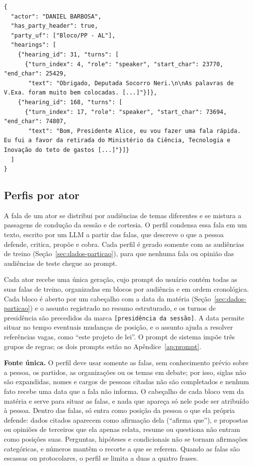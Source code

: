 \begin{lstlisting}[float=tbp,caption={Exemplo de registro de falas por ator, restrito às audiências
de treino. Os textos foram truncados em {[\ldots]}, e o campo com a concatenação dos turnos de cada
audiência foi omitido.},label=lst:ator]
{
  "actor": "DANIEL BARBOSA",
  "has_party_header": true,
  "party_uf": ["Bloco/PP - AL"],
  "hearings": [
    {"hearing_id": 31, "turns": [
      {"turn_index": 4, "role": "speaker", "start_char": 23770, "end_char": 25429,
       "text": "Obrigado, Deputada Socorro Neri.\n\nAs palavras de V.Exa. foram muito bem colocadas. [...]"}]},
    {"hearing_id": 168, "turns": [
      {"turn_index": 17, "role": "speaker", "start_char": 73694, "end_char": 74807,
       "text": "Bom, Presidente Alice, eu vou fazer uma fala rápida. Eu fui a favor da retirada do Ministério da Ciência, Tecnologia e Inovação do teto de gastos [...]"}]}
  ]
}
\end{lstlisting}

\subsection{Perfis por ator}
\label{sec:metodo-perfis}

A fala de um ator se distribui por audiências de temas diferentes e se mistura a passagens de
condução da sessão e de cortesia. O perfil condensa essa fala em um texto, escrito por um LLM a
partir das falas, que descreve o que a pessoa defende, critica, propõe e cobra. Cada perfil é gerado
somente com as audiências de treino (Seção~\ref{sec:dados-particao}), para que nenhuma fala
ou opinião das audiências de teste chegue ao prompt.

Cada ator recebe uma única geração, cujo prompt do usuário contém todas as suas falas de treino,
organizadas em blocos por audiência e em ordem cronológica. Cada bloco é aberto por um cabeçalho com a
data da matéria (Seção~\ref{sec:dados-particao}) e o assunto registrado no resumo estruturado, e os turnos de
presidência são precedidos da marca \texttt{[presidência da sessão]}. A data permite situar no tempo
eventuais mudanças de posição, e o assunto ajuda a resolver referências vagas, como ``este projeto
de lei''. O prompt de sistema impõe três grupos de regras; os dois prompts estão no
Apêndice~\ref{ap:prompt}.

\textbf{Fonte única.} O perfil deve usar somente as falas, sem conhecimento prévio sobre a pessoa,
os partidos, as organizações ou os temas em debate; por isso, siglas não são expandidas, nomes e
cargos de pessoas citadas não são completados e nenhum fato recebe uma data que a fala não informa.
O cabeçalho de cada bloco vem da matéria e serve para situar as falas, e nada que apareça só nele
pode ser atribuído à pessoa. Dentro das falas, só entra como posição da pessoa o que ela própria
defende: dados citados aparecem como afirmação dela (``afirma que''), e propostas ou opiniões de
terceiros que ela apenas relata, resume ou questiona não entram como posições suas. Perguntas,
hipóteses e condicionais não se tornam afirmações categóricas, e números mantêm o recorte a que se referem. Quando as falas são escassas ou
protocolares, o perfil se limita a duas a quatro frases.

